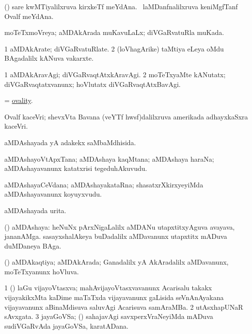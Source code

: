 \noindent
\gl{\pagu}
\bmng
{} (\birx) 
\banum
{} sare kwMTiyalilxruva kirxkeTf meYdAna. 
 \da\ laMDanfnalilxruva keniMgfTanf Ovalf meYdAna. 
\eanum
\emng
\eentry

\bentry
{}
\gl{\gu}
\bmng
moTeTxmoVreya; aMDAkArada muKavuLaLx; diVGaRvatuRla muKada. 
\emng
\eentry

\bentry
{}
\gl{\nA}
\bmng
\bnum
\num{1} aMDAkArate; diVGaRvatuRlate. 
\num{2} (loVhagArike) taMtiya eLeya oMdu BAgadalilx kANuva vakarxte. 
\enum
\emng
\eentry

\bentry
{}
\gl{\kirxvi}
\bmng
\bnum
\num{1} aMDAkAravAgi; diVGaRvaqtAtxkAravAgi. 
\num{2} moTeTxyaMte kANutatx; diVGaRvaqtatxvanunx; hoVlutatx diVGaRvaqtAtxBavAgi. 
\enum
\emng
\eentry

\bentry
{}
\gl{\nA}
\bmng
= \hyperlink{ovality}{ovality}. 
\emng
\eentry

\bentry
{}
\gl{\nA}
\bmng
Ovalf kaceVri; shevxVta Bavana (veYTf hwsf)dalilxruva amerikada adhayxkaSxra kaceVri. 
\emng
\eentry

\bentry
{}
\gl{\gu}
\bmng
aMDAshayada yA adakekx saMbaMdhisida. 
\emng
\eentry

\bentry
{}
\gl{\nA}
\bmng
aMDAshayoVtApxTana; aMDAshaya kaqMtana; aMDAshaya haraNa; aMDAshayavanunx katatxrisi tegeduhAkuvudu. 
\emng
\eentry

\bentry
{}
\gl{\nA}
\bmng
aMDAshayaCeVdana; aMDAshayakataRna; shasatxrXkirxyeyiMda aMDAshayavanunx koyuyxvudu. 
\emng
\eentry

\bentry
{}
\gl{\nA}
\bmng
aMDAshayada urita. 
\emng
\eentry

\bentry
{}
\gl{\nA}
\bmng
(\jiVvi) aMDAshaya: 
\banum
{} heNuNx pArxNigaLalilx aMDANu utapxtitxyAguva avayava, jananAMga. 
 sasayxshalAkeya buDadalilx aMDavanunx utapxtitx mADuva duMDaneya BAga. 
\eanum
\emng
\eentry

\bentry
{}
\gl{\gu}
\bmng
(\jiVvi) aMDAkaqtiya; aMDAkArada; Ganadalilx yA AkAradalilx aMDavanunx, moTeTxyanunx hoVluva. 
\emng
\eentry

\bentry
{}
\gl{\nA}
\bmng
\bnum
\num{1} (\roVca) laGu vijayoVtasxva; mahAvijayoVtasxvavanunx Acarisalu takakx vijayakikxMta kaDime maTaTxda vijayavanunx gaLisida seVnAnAyakana vijayavanunx aBinaMdisuva saluvAgi Acarisuva samAraMBa. 
\num{2} utAsxhapUNaR sAvxgata. 
\num{3} jayaGoVSa; (\kanmu) sahajavAgi savxperxVraNeyiMda mADuva sudiVGaRvAda jayaGoVSa, karatADana. 
\enum
\emng

